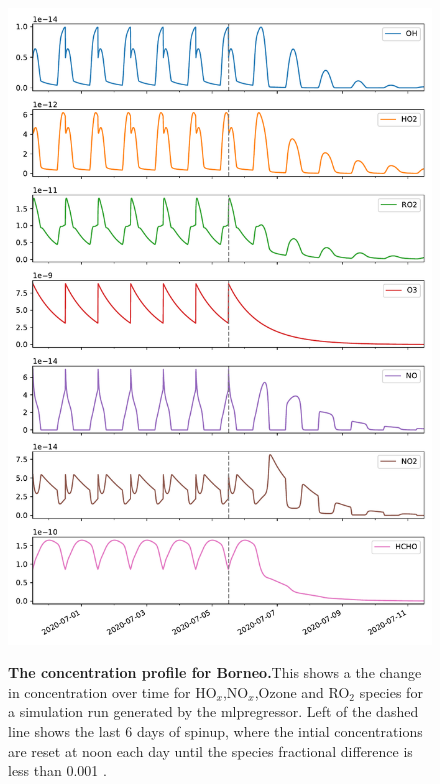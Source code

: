 \newpage


\begin{figure}[H]
    \centering
\includegraphics[width=.9\textwidth]{figures_c3/mlpregressor/conc_borneo.pdf}
\label{fig:cborneo}
\caption{\textbf{The concentration profile for Borneo.}This shows a the change in concentration over time for HO$_x$,NO$_x$,Ozone and RO$_2$ species for a simulation run generated by the mlpregressor. Left of the dashed line shows the last 6 days of spinup, where the intial concentrations are reset at noon each day until the species fractional difference is less than 0.001 .}
\end{figure}

\newpage


